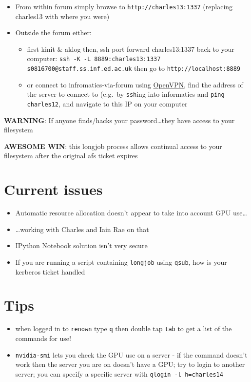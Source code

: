 \documentclass[]{article}
\begin{document}
\begin{enumerate}
  \begin{itemize}
  \itemsep1pt\parskip0pt
  \item
    From within forum simply browse to \texttt{http://charles13:1337}
    (replacing charles13 with where you were)
  \item
    Outside the forum either:

    \begin{itemize}
    \itemsep1pt\parskip0pt
    \item
      first kinit \& aklog then, ssh port forward charles13:1337 back to
      your computer:
      \texttt{ssh -K -L 8889:charles13:1337 s0816700@staff.ss.inf.ed.ac.uk}
      then go to \texttt{http://localhost:8889}
    \item
      or connect to infromatics-via-forum using
      \href{http://computing.help.inf.ed.ac.uk/openvpn}{OpenVPN}, find
      the address of the server to connect to (e.g.~by \texttt{ssh}ing
      into informatics and \texttt{ping charles12}, and navigate to this
      IP on your computer
    \end{itemize}
  \end{itemize}
\end{enumerate}

{\textbf{WARNING}}: If anyone finds/hacks your password\ldots{}they have
access to your filesystem

\textbf{AWESOME WIN}: this longjob process allows continual access to
your filesystem after the original afs ticket expires

\section{Current issues}\label{current-issues}

\begin{itemize}
\itemsep1pt\parskip0pt
\item
  Automatic resource allocation doesn't appear to take into account GPU
  use\ldots{}
\item
  \ldots{}working with Charles and Iain Rae on that
\item
  IPython Notebook solution isn't very secure
\item
  If you are running a script containing \texttt{longjob} using
  \texttt{qsub}, how is your kerberos ticket handled
\end{itemize}

\section{Tips}\label{tips}

\begin{itemize}
\itemsep1pt\parskip0pt
\item
  when logged in to \texttt{renown} type \texttt{q} then double tap
  \texttt{tab} to get a list of the commands for use!
\item
  \texttt{nvidia-smi} lets you check the GPU use on a server - if the
  command doesn't work then the server you are on doesn't have a GPU;
  try to login to another server; you can specify a specific server with
  \texttt{qlogin -l h=charles14}
\end{itemize}
\end{document}
